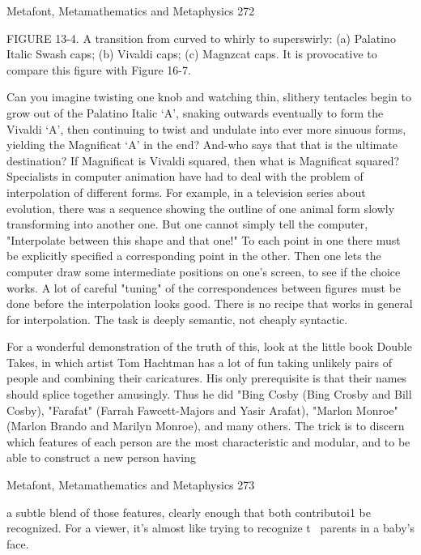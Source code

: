 Metafont, Metamathematics and Metaphysics                                               272

FIGURE 13-4. A transition from curved to whirly to superswirly: (a) Palatino Italic
Swash caps; (b) Vivaldi caps; (c) Magnzcat caps. It is provocative to compare this figure
with Figure 16-7.

Can you imagine twisting one knob and watching thin, slithery tentacles begin to grow
out of the Palatino Italic `A', snaking outwards eventually to form the Vivaldi `A', then
continuing to twist and undulate into ever more sinuous forms, yielding the Magnificat
`A' in the end? And-who says that that is the ultimate destination? If Magnificat is
Vivaldi squared, then what is Magnificat squared?
         Specialists in computer animation have had to deal with the problem of
interpolation of different forms. For example, in a television series about evolution, there
was a sequence showing the outline of one animal form slowly transforming into another
one. But one cannot simply tell the computer, "Interpolate between this shape and that
one!" To each point in one there must be explicitly specified a corresponding point in the
other. Then one lets the computer draw some intermediate positions on one's screen, to
see if the choice works. A lot of careful "tuning" of the correspondences between figures
must be done before the interpolation looks good. There is no recipe that works in general
for interpolation. The task is deeply semantic, not cheaply syntactic.

        For a wonderful demonstration of the truth of this, look at the little book Double
Takes, in which artist Tom Hachtman has a lot of fun taking unlikely pairs of people and
combining their caricatures. His only prerequisite is that their names should splice
together amusingly. Thus he did "Bing Cosby (Bing Crosby and Bill Cosby), "Farafat"
(Farrah Fawcett-Majors and Yasir Arafat), "Marlon Monroe" (Marlon Brando and
Marilyn Monroe), and many others. The trick is to discern which features of each person
are the most characteristic and modular, and to be able to construct a new person having




Metafont, Metamathematics and Metaphysics                                               273

a subtle blend of those features, clearly enough that both contributoi1 be recognized. For
a viewer, it's almost like trying to recognize t~ parents in a baby's face.

